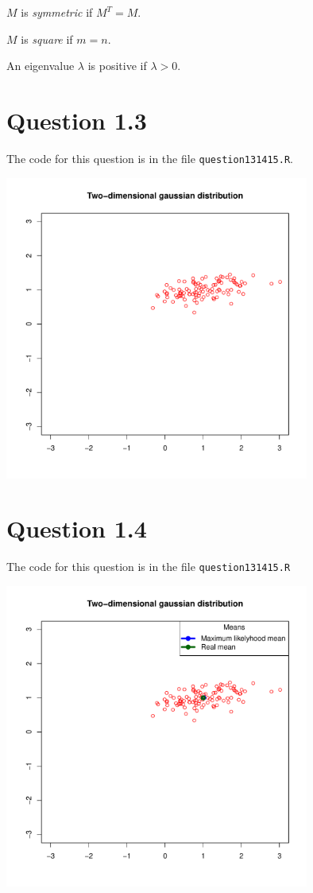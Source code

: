\documentclass[a4paper, oneside, final]{memoir}
\begin{document}
$M$ is \textit{symmetric} if $M^T=M$.

$M$ is \textit{square} if $m=n$.

An eigenvalue $\lambda$ is positive if $\lambda > 0$.

\section*{Question 1.3}

The code for this question is in the file \texttt{question131415.R}.

\includegraphics[width=10cm]{img/question13-plot.pdf}

\section*{Question 1.4}

The code for this question is in the file \texttt{question131415.R}

\includegraphics[width=10cm]{img/question14-plot.pdf}
\end{document}
